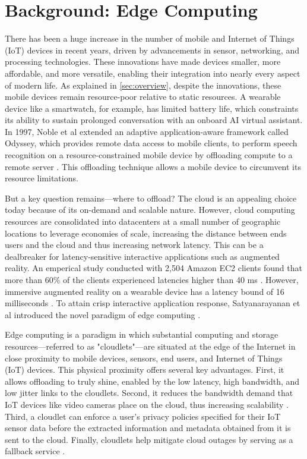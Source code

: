 \section{Background: Edge Computing}
\label{sec:bg-edge}

There has been a huge increase in the number of mobile and Internet of Things
(IoT) devices in recent years, driven by advancements in sensor, networking,
and processing technologies.  These innovations have made devices smaller, more
affordable, and more versatile, enabling their integration into nearly every
aspect of modern life. As explained in \cref{sec:overview}, despite the
innovations, these mobile devices remain resource-poor relative to static
resources. A wearable device like a smartwatch, for example, has limited
battery life, which constraints its ability to sustain prolonged conversation
with an onboard AI virtual assistant. In 1997, Noble et al extended an adaptive
application-aware framework called Odyssey, which provides remote data access
to mobile clients, to perform speech recognition on a resource-constrained
mobile device by offloading compute to a remote server \cite{noble1997}. This
offloading technique allows a mobile device to circumvent its resource
limitations.

But a key question remains---where to offload? The cloud is an
appealing choice today because of its on-demand and scalable nature. However,
cloud computing resources are consolidated into datacenters at a small number
of geographic locations to leverage economies of scale, increasing the distance
between ends users and the cloud and thus increasing network latency. This can
be a dealbreaker for latency-sensitive interactive applications such as
augmented reality. An emperical study conducted with 2,504 Amazon EC2 clients
found that more than 60\% of the clients experienced latencies higher than 40
ms \cite{choy2012}. However, immersive augmented reality on a wearable device
has a latency bound of 16 milliseconds \cite{ellis2004}.
To attain crisp interactive application response,
Satyanarayanan et al introduced the novel paradigm of edge computing
\cite{satya2009}.


Edge computing is a paradigm in which substantial computing and storage
resources---referred to as "cloudlets"---are situated at the edge of the
Internet in close proximity to mobile devices, sensors, end users, and Internet
of Things (IoT) devices. This physical proximity offers several key advantages.
First, it allows offloading to truly shine, enabled by the low latency, high
bandwidth, and low jitter links to the cloudlets. Second, it reduces the
bandwidth demand that IoT devices like video cameras place on the cloud, thus
increasing scalability \cite{premsankar2018}. Third, a cloudlet can enforce a
user's privacy policies specified for their IoT sensor data before the
extracted information and metadata obtained from it is sent to the cloud.
Finally, cloudlets help mitigate cloud outages by serving as a fallback service
\cite{satya2017}.

